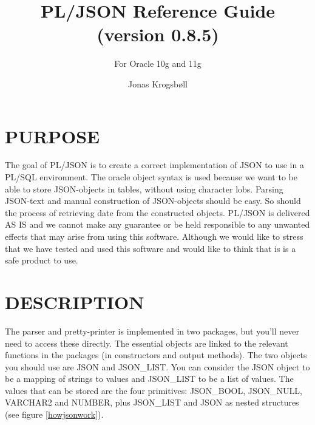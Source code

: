 \documentclass[11pt,twocolumn, a4paper]{article}
\title{PL/JSON Reference Guide (version 0.8.5)}
\subtitle{For Oracle 10g and 11g}
\author{Jonas Krogsbøll}
\date{}
\begin{document}
\maketitle

\section*{PURPOSE}
The goal of PL/JSON is to create a correct implementation of JSON to use in a PL/SQL environment. The oracle object syntax is used because we want to be able to store JSON-objects in tables, without using character lobs. Parsing JSON-text and manual construction of JSON-objects should be easy. So should the process of retrieving date from the constructed objects. PL/JSON is delivered AS IS and we cannot make any guarantee or be held responsible to any unwanted effects that may arise from using this software. Although we would like to stress that we have tested and used this software and would like to think that is is a safe product to use.

\section*{DESCRIPTION}
The parser and pretty-printer is implemented in two packages, but you'll never need to access these directly. The essential objects are linked to the relevant functions in the packages (in constructors and output methods). The two objects you should use are JSON and JSON\_LIST. You can consider the JSON object to be a mapping of strings to values and JSON\_LIST to be a list of values. The values that can be stored are the four primitives: JSON\_BOOL, JSON\_NULL, VARCHAR2 and NUMBER, plus JSON\_LIST and JSON as nested structures (see figure \ref{howjsonwork}).
\end{document}
